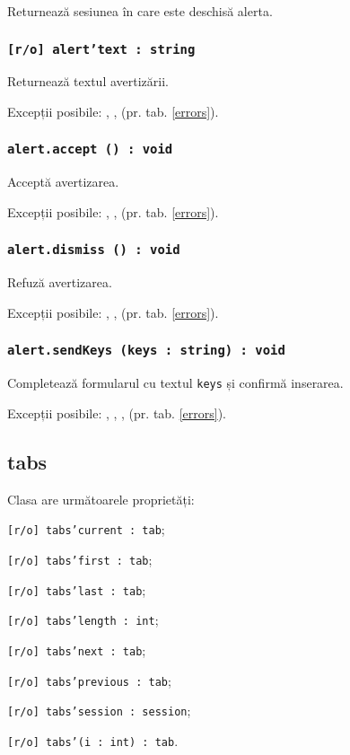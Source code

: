 Returnează sesiunea în care este deschisă alerta.

\subsubsection{\texttt{[r/o] alert'text : string}}

Returnează textul avertizării.

Excepții posibile: , ,  (pr. tab. \ref{errors}).

\subsubsection{\texttt{alert.accept () : void}}

Acceptă avertizarea.

Excepții posibile: , ,  (pr. tab. \ref{errors}).

\subsubsection{\texttt{alert.dismiss () : void}}

Refuză avertizarea.

Excepții posibile: , ,  (pr. tab. \ref{errors}).

\subsubsection{\texttt{alert.sendKeys (keys : string) : void}}

Completează formularul cu textul \texttt{keys} și confirmă inserarea.

Excepții posibile: , , ,  (pr. tab. \ref{errors}).

\subsection{tabs}

Clasa \tabs{} are următoarele proprietăți:
\begin{icItems}
	\item \texttt{[r/o] tabs'current : tab};
	\item \texttt{[r/o] tabs'first : tab};
	\item \texttt{[r/o] tabs'last : tab};
	\item \texttt{[r/o] tabs'length : int};
	\item \texttt{[r/o] tabs'next : tab};
	\item \texttt{[r/o] tabs'previous : tab};
	\item \texttt{[r/o] tabs'session : session};
	\item \texttt{[r/o] tabs'(i : int) : tab}.
\end{icItems}

